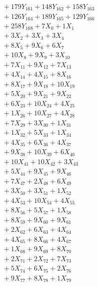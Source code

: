 \documentclass[a4paper,10pt]{article}
\begin{document}
{\begin{align}
&\;  + 179 Y_{161} + 148 Y_{162} + 158 Y_{163} \\[0.3ex]
&\;  + 126 Y_{164} + 189 Y_{165} + 129 Y_{166} \\[0.3ex]
&\;  + 258 Y_{168} + 7 X_{0} + 1 X_{1} \\[0.3ex]
&\;  + 3 X_{2} + 3 X_{3} + 3 X_{4} \\[0.3ex]
&\;  + 8 X_{5} + 9 X_{6} + 6 X_{7} \\[0.3ex]
&\;  + 10 X_{8} + 9 X_{9} + 3 X_{10} \\[0.5ex]\allowbreak
&\;  + 7 X_{11} + 9 X_{12} + 7 X_{13} \\[0.3ex]
&\;  + 4 X_{14} + 4 X_{15} + 8 X_{16} \\[0.3ex]
&\;  + 8 X_{17} + 9 X_{18} + 10 X_{19} \\[0.3ex]
&\;  + 5 X_{20} + 9 X_{21} + 9 X_{22} \\[0.3ex]
&\;  + 6 X_{23} + 10 X_{24} + 4 X_{25} \\[0.3ex]
&\;  + 1 X_{26} + 10 X_{27} + 4 X_{28} \\[0.3ex]
&\;  + 7 X_{29} + 3 X_{30} + 1 X_{31} \\[0.3ex]
&\;  + 1 X_{32} + 5 X_{33} + 1 X_{34} \\[0.3ex]
&\;  + 4 X_{35} + 6 X_{36} + 4 X_{37} \\[0.3ex]
&\;  + 9 X_{38} + 10 X_{39} + 6 X_{40} \\[0.5ex]\allowbreak
&\;  + 10 X_{41} + 10 X_{42} + 3 X_{43} \\[0.3ex]
&\;  + 5 X_{44} + 9 X_{45} + 9 X_{46} \\[0.3ex]
&\;  + 7 X_{47} + 2 X_{48} + 6 X_{49} \\[0.3ex]
&\;  + 3 X_{50} + 3 X_{51} + 1 X_{52} \\[0.3ex]
&\;  + 4 X_{53} + 10 X_{54} + 4 X_{55} \\[0.3ex]
&\;  + 8 X_{56} + 5 X_{57} + 1 X_{58} \\[0.3ex]
&\;  + 8 X_{59} + 9 X_{60} + 9 X_{61} \\[0.3ex]
&\;  + 2 X_{62} + 6 X_{63} + 4 X_{64} \\[0.3ex]
&\;  + 4 X_{65} + 8 X_{66} + 4 X_{67} \\[0.3ex]
&\;  + 1 X_{68} + 9 X_{69} + 8 X_{70} \\[0.5ex]\allowbreak
&\;  + 2 X_{71} + 2 X_{72} + 7 X_{73} \\[0.3ex]
&\;  + 5 X_{74} + 6 X_{75} + 2 X_{76} \\[0.3ex]
&\;  + 9 X_{77} + 8 X_{78} + 1 X_{79} \\[0.3ex]

\end{align}}
\end{document}
